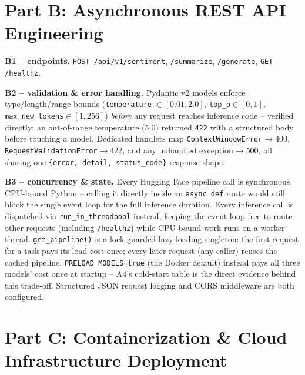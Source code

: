 \documentclass[11pt,a4paper]{article}
\begin{document}
\section*{Part B: Asynchronous REST API Engineering}

\textbf{B1 -- endpoints.} \texttt{POST /api/v1/sentiment}, \texttt{/summarize},
\texttt{/generate}, \texttt{GET /healthz}.

\textbf{B2 -- validation \& error handling.} Pydantic v2 models enforce type/length/range
bounds (\texttt{temperature} $\in[0.01,2.0]$, \texttt{top\_p}$\in[0,1]$,
\texttt{max\_new\_tokens}$\in[1,256]$) \emph{before} any request reaches inference code --
verified directly: an out-of-range temperature (5.0) returned \texttt{422} with a structured
body before touching a model. Dedicated handlers map \texttt{ContextWindowError}$\to$400,
\texttt{RequestValidationError}$\to$422, and any unhandled exception$\to$500, all sharing one
\texttt{\{error, detail, status\_code\}} response shape.

\textbf{B3 -- concurrency \& state.} Every Hugging Face pipeline call is synchronous, CPU-bound
Python -- calling it directly inside an \texttt{async def} route would still block the single
event loop for the full inference duration. Every inference call is dispatched via
\texttt{run\_in\_threadpool} instead, keeping the event loop free to route other requests
(including \texttt{/healthz}) while CPU-bound work runs on a worker thread. \texttt{get\_pipeline()}
is a lock-guarded lazy-loading singleton: the first request for a task pays its load cost once;
every later request (any caller) reuses the cached pipeline. \texttt{PRELOAD\_MODELS=true}
(the Docker default) instead pays all three models' cost once at startup -- A4's cold-start
table is the direct evidence behind this trade-off. Structured JSON request logging and CORS
middleware are both configured.

\section*{Part C: Containerization \& Cloud Infrastructure Deployment}
\end{document}

